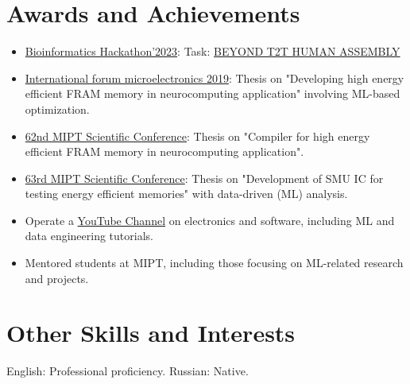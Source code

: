 \documentclass{article}
\begin{document}
\section{Awards and Achievements}
\begin{itemize}
\item \href{https://bioinf.institute/hack}{Bioinformatics Hackathon'2023}: Task: \href{https://drive.google.com/file/d/16DjU3LqIIUr3Pgvbd6ZjuT_4wTFEsvf1/view?usp=share_link}{BEYOND T2T HUMAN ASSEMBLY}
\item \href{https://microelectronica.pro/}{International forum microelectronics 2019}: Thesis on "Developing high energy efficient FRAM memory in neurocomputing application" involving ML-based optimization.
\item  \href{https://conf62.mipt.ru/}{62nd MIPT Scientific Conference}: Thesis on "Compiler for high energy efficient FRAM memory in neurocomputing application".
\item \href{https://mipt.ru/science/5top100/education/courseproposal/%D0%A4%D0%AD%D0%A4%D0%9C.pdf}{63rd MIPT Scientific Conference}: Thesis on "Development of SMU IC for testing energy efficient memories" with data-driven (ML) analysis.
\item Operate a \href{https://www.youtube.com/channel/UCAjmXQnYQjWoVHx6NIo24CQ}{YouTube Channel} on electronics and software, including ML and data engineering tutorials.
\item Mentored students at MIPT, including those focusing on ML-related research and projects.
\end{itemize}

\section{Other Skills and Interests}
\begin{description}[widest=Languages]
\item[Languages] English: Professional proficiency. Russian: Native.
\end{description}
 
\end{document}
